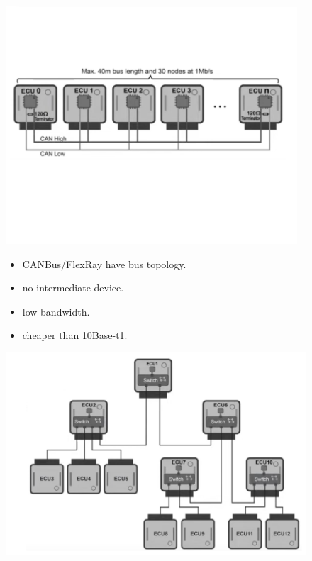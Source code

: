 \begin{figure}[h]
    \centering
    \begin{minipage}[t]{0.45\textwidth}
        \centering
        \includegraphics[width=\textwidth]{img/bus_eth}

        \begin{flushleft}
            \begin{itemize}[nosep]
                \item CANBus/FlexRay have bus topology.
                \item no intermediate device.
                \item low bandwidth.
                \item cheaper than 10Base-t1.
            \end{itemize}
        \end{flushleft}
    \end{minipage}
    \begin{minipage}[t]{0.45\textwidth}
        \centering
        \includegraphics[width=\textwidth]{img/star_eth}


\end{minipage}
\end{figure}
